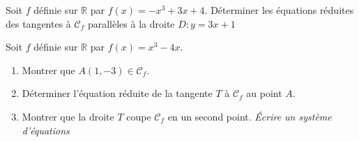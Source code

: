 \documentclass[main.tex]{subfiles}
\begin{document}
\begin{exercise}\label{chapter04:exercice:tangente03} 
	Soit $f$ définie sur $\mathbb{R}$ par $f(x)=-x^3+3x+4$. Déterminer les équations réduites des tangentes à $\mathscr{C}_f$ parallèles à la droite $D\colon y=3x+1$
\end{exercise}

\begin{exercise} \label{chapter04:exercice:tangente04}  
	Soit $f$ définie sur $\mathbb{R}$ par $f(x)=x^3-4x$. 
	\begin{enumerate}[label={\arabic*)}, leftmargin=*]
		\item Montrer que $A(1,-3) \in\mathscr{C}_f$.
		\item Déterminer l'équation réduite de la tangente $T$ à $\mathscr{C}_f$ au point $A$.
		\item Montrer que la droite $T$ coupe $\mathscr{C}_f$ en un second point. \emph{Écrire un système d'équations}
	\end{enumerate} 
\end{exercise}
\end{document}
